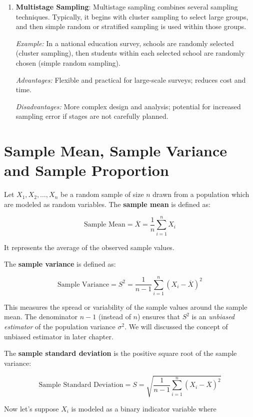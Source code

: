 \documentclass[twoside]{book}
\begin{document}
\begin{enumerate}
\item \textbf{Multistage Sampling}: Multistage sampling combines several sampling techniques. Typically, it begins with cluster sampling to select large groups, and then simple random or stratified sampling is used within those groups.

\textit{Example:} In a national education survey, schools are randomly selected (cluster sampling), then students within each selected school are randomly chosen (simple random sampling).

\textit{Advantages:} Flexible and practical for large-scale surveys; reduces cost and time.

\textit{Disadvantages:} More complex design and analysis; potential for increased sampling error if stages are not carefully planned.
\end{enumerate}

\section{Sample Mean, Sample Variance and Sample Proportion}

Let \( X_1, X_2, \dots, X_n \) be a random sample of size \( n \) drawn from a population which are modeled as random variables. The \textbf{sample mean} is defined as:
\begin{textbox}
     \[
\text{Sample Mean} = \overline{X} = \frac{1}{n} \sum_{i=1}^{n} X_i
\]
\end{textbox}
It represents the average of the observed sample values.

The \textbf{sample variance} is defined as:
\begin{textbox}
\[
\text{Sample Variance} = S^2 = \frac{1}{n - 1} \sum_{i=1}^{n} (X_i - \overline{X})^2
\]
\end{textbox}
This measures the spread or variability of the sample values around the sample mean. The denominator \( n - 1 \) (instead of \( n \)) ensures that \( S^2 \) is an \emph{unbiased estimator} of the population variance \( \sigma^2 \). We will discussed the concept of unbiased estimator in later chapter.

The \textbf{sample standard deviation} is the positive square root of the sample variance:
\begin{textbox}
\[
\text{Sample Standard Deviation} = S = \sqrt{\frac{1}{n - 1} \sum_{i=1}^{n} (X_i - \overline{X})^2}
\]
\end{textbox}

Now let's suppose \( X_i \) is modeled as a binary indicator variable where
\end{document}
